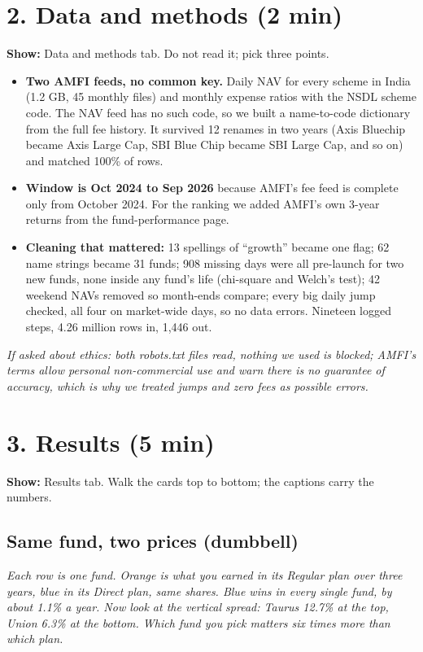 \documentclass[11pt,a4paper]{article}
\newcommand{\say}[1]{\par\medskip\noindent\textcolor{black!70}{\textit{#1}}\par\medskip}
\newcommand{\onscreen}[1]{\noindent\textbf{Show:} #1\par}
\begin{document}
\section*{2. Data and methods (2 min)}
\onscreen{Data and methods tab. Do not read it; pick three points.}
\begin{itemize}
  \item \textbf{Two AMFI feeds, no common key.} Daily NAV for every scheme in India (1.2 GB, 45 monthly files) and monthly expense ratios with the NSDL scheme code. The NAV feed has no such code, so we built a name-to-code dictionary from the full fee history. It survived 12 renames in two years (Axis Bluechip became Axis Large Cap, SBI Blue Chip became SBI Large Cap, and so on) and matched 100\% of rows.
  \item \textbf{Window is Oct 2024 to Sep 2026} because AMFI's fee feed is complete only from October 2024. For the ranking we added AMFI's own 3-year returns from the fund-performance page.
  \item \textbf{Cleaning that mattered:} 13 spellings of ``growth'' became one flag; 62 name strings became 31 funds; 908 missing days were all pre-launch for two new funds, none inside any fund's life (chi-square and Welch's test); 42 weekend NAVs removed so month-ends compare; every big daily jump checked, all four on market-wide days, so no data errors. Nineteen logged steps, 4.26 million rows in, 1,446 out.
\end{itemize}
\say{If asked about ethics: both robots.txt files read, nothing we used is blocked; AMFI's terms allow personal non-commercial use and warn there is no guarantee of accuracy, which is why we treated jumps and zero fees as possible errors.}

\section*{3. Results (5 min)}
\onscreen{Results tab. Walk the cards top to bottom; the captions carry the numbers.}

\subsection*{Same fund, two prices (dumbbell)}
\say{Each row is one fund. Orange is what you earned in its Regular plan over three years, blue in its Direct plan, same shares. Blue wins in every single fund, by about 1.1\% a year. Now look at the vertical spread: Taurus 12.7\% at the top, Union 6.3\% at the bottom. Which fund you pick matters six times more than which plan.}
\end{document}
